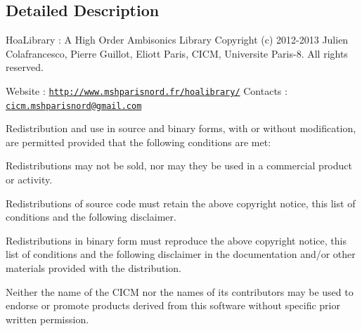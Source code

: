 \subsection{Detailed Description}
Hoa\-Library \-: A High Order Ambisonics Library Copyright (c) 2012-\/2013 Julien Colafrancesco, Pierre Guillot, Eliott Paris, C\-I\-C\-M, Universite Paris-\/8. All rights reserved.

Website \-: \href{http://www.mshparisnord.fr/hoalibrary/}{\tt http\-://www.\-mshparisnord.\-fr/hoalibrary/} Contacts \-: \href{mailto:cicm.mshparisnord@gmail.com}{\tt cicm.\-mshparisnord@gmail.\-com}

Redistribution and use in source and binary forms, with or without modification, are permitted provided that the following conditions are met\-:


\begin{DoxyItemize}
\item Redistributions may not be sold, nor may they be used in a commercial product or activity.
\item Redistributions of source code must retain the above copyright notice, this list of conditions and the following disclaimer.
\item Redistributions in binary form must reproduce the above copyright notice, this list of conditions and the following disclaimer in the documentation and/or other materials provided with the distribution.
\item Neither the name of the C\-I\-C\-M nor the names of its contributors may be used to endorse or promote products derived from this software without specific prior written permission.
\end{DoxyItemize}

